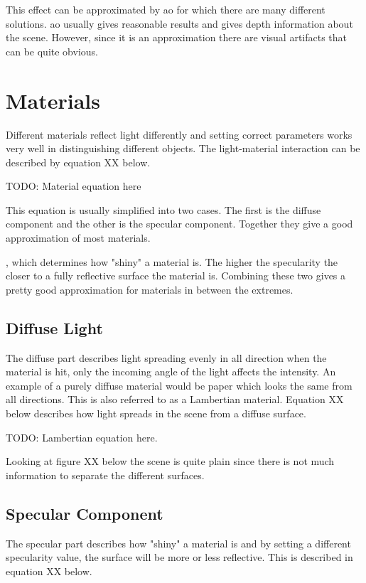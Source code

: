 This effect can be approximated by \gls{ao} for which there are many different solutions. \gls{ao} usually gives reasonable results and gives depth information about the scene. However, since it is an approximation there are visual artifacts that can be quite obvious.

\section{Materials}

Different materials reflect light differently and setting correct parameters works very well in distinguishing different objects. The light-material interaction can be described by equation XX below.

TODO: Material equation here

This equation is usually simplified into two cases. The first is the diffuse component and the other is the specular component. Together they give a good approximation of most materials.

, which determines how "shiny" a material is.
The higher the specularity the closer to a fully reflective surface the material is. Combining these two gives a pretty good approximation for materials in between the extremes.

\subsection{Diffuse Light}

The diffuse part describes light spreading evenly in all direction when the material is hit, only the incoming angle of the light affects the intensity. An example of a purely diffuse material would be paper which looks the same from all directions. This is also referred to as a Lambertian material. Equation XX below describes how light spreads in the scene from a diffuse surface.

TODO: Lambertian equation here.

Looking at figure XX below the scene is quite plain since there is not much information to separate the different surfaces.

\subsection{Specular Component}

The specular part describes how "shiny" a material is and by setting a different specularity value, the surface will be more or less reflective. This is described in equation XX below.

